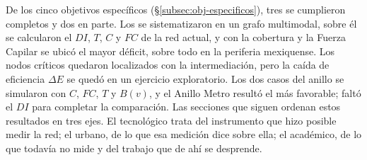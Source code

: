 De los cinco objetivos específicos (§\ref{subsec:obj-especificos}), tres se
cumplieron completos y dos en parte. Los  \gtfs{} se
sistematizaron en un grafo multimodal, sobre él se calcularon el $DI$, $T$, $C$
y $FC$ de la red actual, y con la cobertura y la Fuerza Capilar se ubicó el
mayor déficit, sobre todo en la periferia mexiquense. Los nodos críticos
quedaron localizados con la intermediación, pero la caída de eficiencia
$\Delta E$ se quedó en un ejercicio exploratorio. Los dos casos del anillo se
simularon con $C$, $FC$, $T$ y $B(v)$, y el Anillo Metro resultó el más
favorable; faltó el $DI$ para completar la comparación. Las secciones que
siguen ordenan estos resultados en tres ejes. El tecnológico trata del
instrumento que hizo posible medir la red; el urbano, de lo que esa medición
dice sobre ella; el académico, de lo que todavía no mide y del trabajo que de
ahí se desprende.




